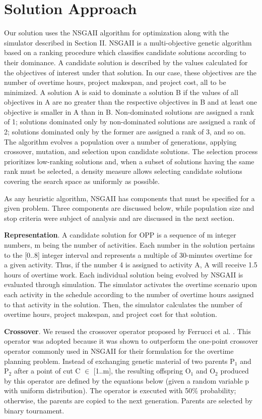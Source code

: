 \documentclass[conference]{IEEEtran}
\begin{document}
\section{Solution Approach}
Our solution uses the NSGAII algorithm for optimization along with the simulator described in Section II. NSGAII \cite{deb:2002} is a multi-objective genetic algorithm based on a ranking procedure which classifies candidate solutions according to their dominance. A candidate solution is described by the values calculated for the objectives of interest under that solution. In our case, these objectives are the number of overtime hours, project makespan, and project cost, all to be minimized. A solution A is said to dominate a solution B if the values of all objectives in A are no greater than the respective objectives in B and at least one objective is smaller in A than in B. Non-dominated solutions are assigned a rank of 1; solutions dominated only by non-dominated solutions are assigned a rank of 2; solutions dominated only by the former are assigned a rank of 3, and so on. The algorithm evolves a population over a number of generations, applying crossover, mutation, and selection upon candidate solutions. The selection process prioritizes low-ranking solutions and, when a subset of solutions having the same rank must be selected, a density measure allows selecting candidate solutions covering the search space as uniformly as possible. 

As any heuristic algorithm, NSGAII has components that must be specified for a given problem. Three components are discussed below, while population size and stop criteria were subject of analysis and are discussed in the next section.

\noindent
\textbf{Representation}. A candidate solution for OPP is a sequence of m integer numbers, m being the number of activities. Each number in the solution pertains to the [0..8] integer interval and represents a multiple of 30-minutes overtime for a given activity. Thus, if the number 4 is assigned to activity A, A will receive 1.5 hours of overtime work. Each individual solution being evolved by NSGAII is evaluated through simulation. The simulator activates the overtime scenario upon each activity in the schedule according to the number of overtime hours assigned to that activity in the solution. Then, the simulator calculates the number of overtime hours, project makespan, and project cost for that solution.

\noindent
\textbf{Crossover}. We reused the crossover operator proposed by Ferrucci et al. \cite{Ferrucci:2013}. This operator was adopted because it was shown to outperform the one-point crossover operator commonly used in NSGAII for their formulation for the overtime planning problem. Instead of exchanging genetic material of two parents P$_{1}$ and P$_{2}$ after a point of cut C $\in$ [1..m], the resulting offspring O$_{1}$ and O$_{2}$ produced by this operator are defined by the equations below (given a random variable p with uniform distribution). The operator is executed with 50\% probability; otherwise, the parents are copied to the next generation. Parents are selected by binary tournament.
\end{document}
